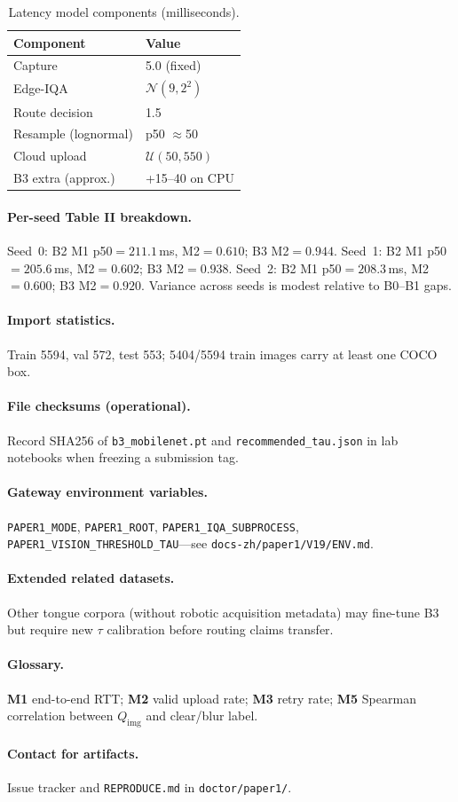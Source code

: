 \begin{table}[h]
\centering
\caption{Latency model components (milliseconds).}
\label{tab:latency-model}
\small
\begin{tabular}{ll}
\hline
Component & Value \\
\hline
Capture & 5.0 (fixed) \\
Edge-IQA & $\mathcal{N}(9, 2^2)$ \\
Route decision & 1.5 \\
Resample (lognormal) & p50 $\approx$50 \\
Cloud upload & $\mathcal{U}(50, 550)$ \\
B3 extra (approx.) & +15--40 on CPU \\
\hline
\end{tabular}
\end{table}

\paragraph{Per-seed Table II breakdown.}
Seed~0: B2 M1 p50$=211.1$\,ms, M2$=0.610$; B3 M2$=0.944$.
Seed~1: B2 M1 p50$=205.6$\,ms, M2$=0.602$; B3 M2$=0.938$.
Seed~2: B2 M1 p50$=208.3$\,ms, M2$=0.600$; B3 M2$=0.920$.
Variance across seeds is modest relative to B0--B1 gaps.

\paragraph{Import statistics.}
Train 5594, val 572, test 553; 5404/5594 train images carry at least one COCO box.

\paragraph{File checksums (operational).}
Record SHA256 of \texttt{b3\_mobilenet.pt} and \texttt{recommended\_tau.json} in lab notebooks when freezing a submission tag.

\paragraph{Gateway environment variables.}
\texttt{PAPER1\_MODE}, \texttt{PAPER1\_ROOT}, \texttt{PAPER1\_IQA\_SUBPROCESS}, \texttt{PAPER1\_VISION\_THRESHOLD\_TAU}---see \texttt{docs-zh/paper1/V19/ENV.md}.

\paragraph{Extended related datasets.}
Other tongue corpora (without robotic acquisition metadata) may fine-tune B3 but require new $\tau$ calibration before routing claims transfer.

\paragraph{Glossary.}
\textbf{M1} end-to-end RTT; \textbf{M2} valid upload rate; \textbf{M3} retry rate; \textbf{M5} Spearman correlation between $Q_{\mathrm{img}}$ and clear/blur label.

\paragraph{Contact for artifacts.}
Issue tracker and \texttt{REPRODUCE.md} in \texttt{doctor/paper1/}.
